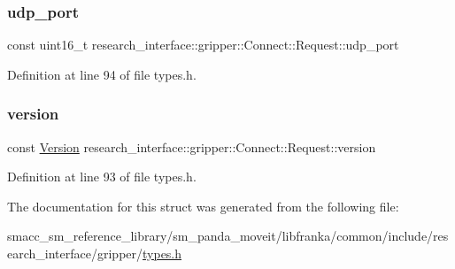 \subsubsection{\texorpdfstring{udp\+\_\+port}{udp\_port}}
{\footnotesize\ttfamily const uint16\+\_\+t research\+\_\+interface\+::gripper\+::\+Connect\+::\+Request\+::udp\+\_\+port}



Definition at line 94 of file types.\+h.

\mbox{\label{structresearch__interface_1_1gripper_1_1Connect_1_1Request_a6caad7ccadefdc3068368e1e466a86c7}} 
\subsubsection{\texorpdfstring{version}{version}}
{\footnotesize\ttfamily const \hyperlink{namespaceresearch__interface_1_1gripper_a76ede520b2fa3582ac95cd919eceef5b}{Version} research\+\_\+interface\+::gripper\+::\+Connect\+::\+Request\+::version}



Definition at line 93 of file types.\+h.



The documentation for this struct was generated from the following file\+:\begin{DoxyCompactItemize}
\item 
smacc\+\_\+sm\+\_\+reference\+\_\+library/sm\+\_\+panda\+\_\+moveit/libfranka/common/include/research\+\_\+interface/gripper/\hyperlink{types_8h}{types.\+h}\end{DoxyCompactItemize}
